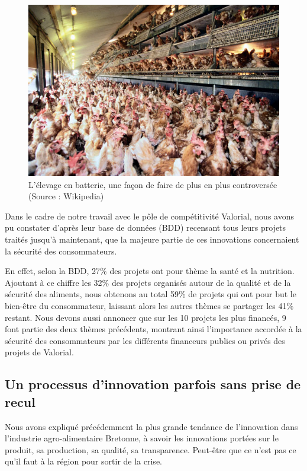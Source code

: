 \documentclass[a4paper,12pt]{report}
\begin{document}
			\begin{figure}[!h]
			\centering
			\includegraphics[scale=0.75]{Illustrations/PouleBatterie.jpg}
			\caption{L'élevage en batterie, une façon de faire de plus en plus controversée\\(Source : Wikipedia)}
			\label{PouleBatterie}
			\end{figure}
			
			Dans le cadre de notre travail avec le pôle de compétitivité Valorial, nous avons pu constater d’après leur base de données (BDD) recensant tous leurs projets traités jusqu’à maintenant, que la majeure partie de ces innovations concernaient la sécurité des consommateurs. 
			
			En effet, selon la BDD, 27\% des projets ont pour thème la santé et la nutrition. Ajoutant à ce chiffre les 32\% des projets  organisés autour de la qualité et de la sécurité des aliments, nous obtenons au total 59\% de projets qui ont pour but le bien-être du consommateur, laissant alors les autres thèmes se partager les 41\% restant. Nous devons aussi annoncer que sur les 10 projets les plus financés, 9 font partie des deux thèmes précédents, montrant ainsi l’importance accordée à la sécurité des consommateurs par les différents financeurs publics ou privés des projets de Valorial.
						
		\subsection{Un processus d'innovation parfois sans prise de recul}
			
			Nous avons expliqué précédemment la plus grande tendance de l’innovation dans l’industrie agro-alimentaire Bretonne, à savoir les innovations portées sur le produit, sa production, sa qualité, sa transparence. Peut-être que ce n’est pas ce qu’il faut à la région pour sortir de la crise.
			
\end{document}
